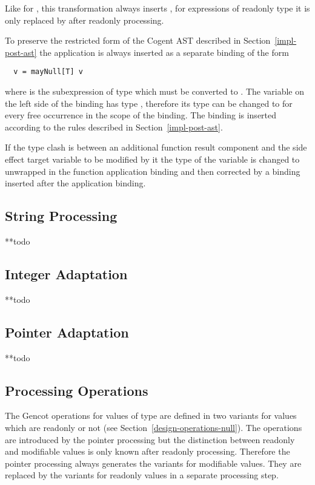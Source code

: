 Like for , this transformation always inserts , for expressions of readonly type it is only replaced by
 after readonly processing.

To preserve the restricted form of the Cogent AST described in Section~\ref{impl-post-ast} the  application is always
inserted as a separate binding of the form
\begin{verbatim}
  v = mayNull[T] v
\end{verbatim}
where  is the subexpression of type  which must be converted to . The variable  on the left side
of the binding has type , therefore its type can be changed to  for every free occurrence in the scope
of the binding. The binding is inserted according to the rules described in Section~\ref{impl-post-ast}.

If the type clash is between an additional function result component and the side effect target variable to be modified by it the
type of the variable is changed to unwrapped in the function application binding and then corrected by a  binding inserted
after the application binding.

\subsection{String Processing}
\label{impl-post-string}

**todo 

\subsection{Integer Adaptation}
\label{impl-post-int}

**todo 

\subsection{Pointer Adaptation}
\label{impl-post-pointer}

**todo 

\subsection{Processing  Operations}
\label{impl-post-opnull}

The Gencot operations for values of  type are defined in two variants for values which are readonly or not (see Section~\ref{design-operations-null}). The operations are introduced by the  pointer processing but the distinction
between readonly and modifiable values is only known after readonly processing. Therefore the  pointer processing
always generates the variants for modifiable values. They are replaced by the variants for readonly values in a separate
processing step.

